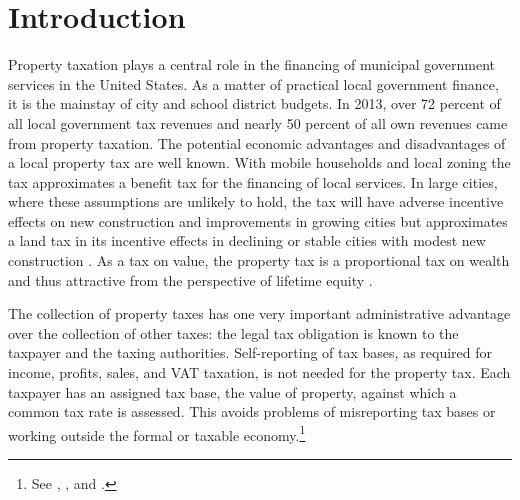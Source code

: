 \documentclass[12pt]{article}
\begin{document}
\newpage

\section{Introduction}

Property taxation plays a central role in the financing of municipal
government services in the United States. As a matter of practical local government
finance, it is the mainstay of city and school district budgets.  In
2013, over 72 percent of all local government tax revenues and nearly
50 percent of all own revenues came from property taxation. The potential economic
advantages and disadvantages of a local property tax are well known.
With mobile households and local zoning the tax approximates a benefit
tax for the financing of local services.  In large cities, where these
assumptions are unlikely to hold, the tax will have adverse incentive
effects on new construction and improvements in growing cities but
approximates a land tax in its incentive effects in declining or
stable cities with modest new construction \cite{Aaron-75}.  As a tax
on value, the property tax is a proportional tax on wealth and thus
attractive from the perspective of lifetime equity
\cite{Mieszkowski-72}.  

The collection of property taxes has one very important administrative
advantage over the collection of other taxes: the legal tax obligation
is known to the taxpayer and the taxing authorities.  Self-reporting
of tax bases, as required for income, profits, sales, and VAT
taxation, is not needed for the property tax. Each taxpayer has an
assigned tax base, the value of property, against which a common tax
rate is assessed.  This avoids problems of misreporting tax bases or
working outside the formal or  taxable economy.\footnote{See
  , , and .}
\end{document}
